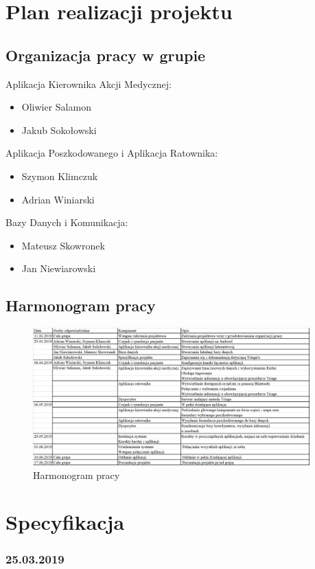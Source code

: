 \documentclass[11pt]{report}
\begin{document}
\section{Plan realizacji projektu}
\subsection{Organizacja pracy w grupie}
Aplikacja Kierownika Akcji Medycznej:
\begin{itemize}
    \item Oliwier Salamon
    \item Jakub Sokołowski
\end{itemize}
Aplikacja Poszkodowanego i Aplikacja Ratownika:
\begin{itemize}
    \item Szymon Klimczuk
    \item Adrian Winiarski
\end{itemize}
Bazy Danych i Komunikacja:
\begin{itemize}
    \item Mateusz Skowronek
    \item Jan Niewiarowski
\end{itemize}

\subsection{Harmonogram pracy}
\begin{figure}[h!]
  \centering
    \includegraphics[width=0.95\textwidth]{img/harmonogram.png}
  \caption{Harmonogram pracy} 
  \label{fig:org}                                       
\end{figure}

\section{Specyfikacja}
\subsubsection{25.03.2019}



\end{document}
